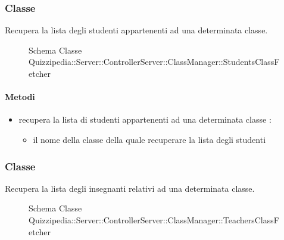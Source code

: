 \subsubsection{Classe }
Recupera la lista degli studenti appartenenti ad una determinata classe.
\begin{figure}[H]
\centering
\noindent{}
\caption[Schema Classe StudentsClassFetcher]{Schema Classe Quizzipedia::Server::ControllerServer::ClassManager::StudentsClassFetcher}
\end{figure}
\paragraph{Metodi}
\begin{itemize}
\item {}
\newline
recupera la lista di studenti appartenenti ad una determinata classe
\newline
{} :
\begin{itemize}
\item {}
\newline
il nome della classe della quale recuperare la lista degli studenti
\end{itemize}
\end{itemize}
\subsubsection{Classe }
Recupera la lista degli insegnanti relativi ad una determinata classe.
\begin{figure}[H]
\centering
\noindent{}
\caption[Schema Classe TeachersClassFetcher]{Schema Classe Quizzipedia::Server::ControllerServer::ClassManager::TeachersClassFetcher}
\end{figure}
